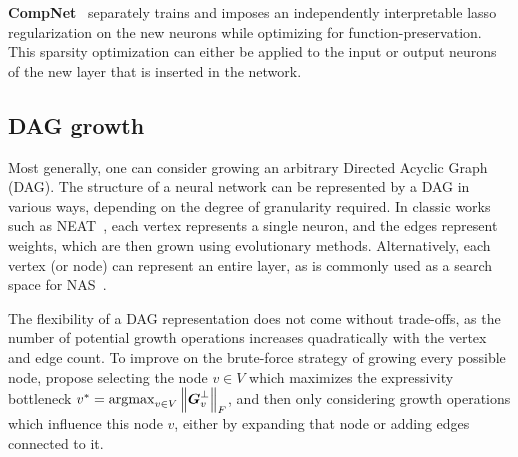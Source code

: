\textbf{CompNet}~\citep{lu_CompNet_2018} separately trains and imposes an independently interpretable lasso regularization on the new neurons while optimizing for function-preservation. This sparsity optimization can either be applied to the input or output neurons of the new layer that is inserted in the network.

\subsection{DAG growth}\label{sec:dag_growth}

Most generally, one can consider growing an arbitrary Directed Acyclic Graph (DAG). The structure of a neural network can be represented by a DAG in various ways, depending on the degree of granularity required. In classic works such as NEAT~\citep{stanley_neat_2002}, each vertex represents a single neuron, and the edges represent weights, which are then grown using evolutionary methods. Alternatively, each vertex (or node) can represent an entire layer, as is commonly used as a search space for NAS~\citep{nasbench101}.

The flexibility of a DAG representation does not come without trade-offs, as the number of potential growth operations increases quadratically with the vertex and edge count. To improve on the brute-force strategy of growing every possible node, \citet{douka_growth_2025} propose selecting the node $v \in V$ which maximizes the expressivity bottleneck $v^*=\operatorname*{\arg\!\max}_{v \in V} \left\lVert\boldsymbol{G}^\perp_v\right\rVert_F$, and then only considering growth operations which influence this node $v$, either by expanding that node or adding edges connected to it.
